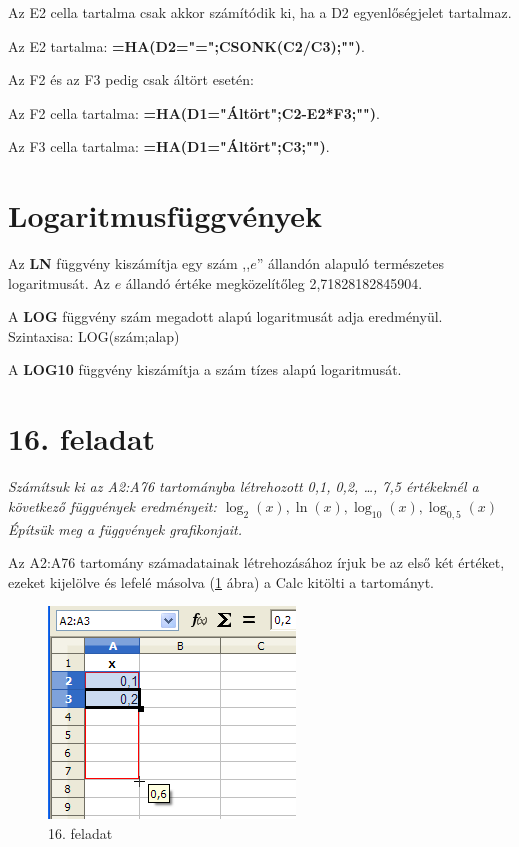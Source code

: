 Az E2 cella tartalma csak akkor számítódik ki, ha a D2
egyenlőségjelet tartalmaz.

Az E2 tartalma:
{\sffamily\bfseries{=HA(D2="=";CSONK(C2/C3);"")}}.

Az F2 és az F3 pedig csak áltört esetén:

Az F2 cella tartalma:
{\sffamily\bfseries{=HA(D1="Áltört";C2-E2*F3;"")}}.

Az F3 cella tartalma:
{\sffamily\bfseries{=HA(D1="Áltört";C3;"")}}.


\section{Logaritmusfüggvények}

Az \textbf{LN} függvény kiszámítja egy szám
,,$e$'' állandón alapuló
természetes logaritmusát. Az $e$ állandó értéke
megközelítőleg 2,71828182845904.

\noindent A \textbf{LOG} függvény szám megadott alapú logaritmusát adja
eredményül. Szintaxisa: LOG(szám;alap)

\noindent A \textbf{LOG10} függvény kiszámítja a szám tízes alapú
logaritmusát.


\section{16. feladat}
{\itshape
Számítsuk ki az A2:A76 tartományba létrehozott 0,1, 0,2,
{\ldots}, 7,5 értékeknél a következő függvények
eredményeit:  $\log_{2}(x),\ln(x),\log_{10}(x),\log_{0,5}(x)$
Építsük meg a függvények grafikonjait.}

Az A2:A76 tartomány számadatainak létrehozásához írjuk be az
első két értéket, ezeket kijelölve és lefelé másolva
(\ref{16-feladat} ábra) a Calc kitölti a tartományt.

\begin{figure}[!h]
\begin{center}
\includegraphics[width=6.56cm]{oocalcv2-img87.png}
\caption{16. feladat}\label{16-feladat}
\end{center}
\end{figure}

